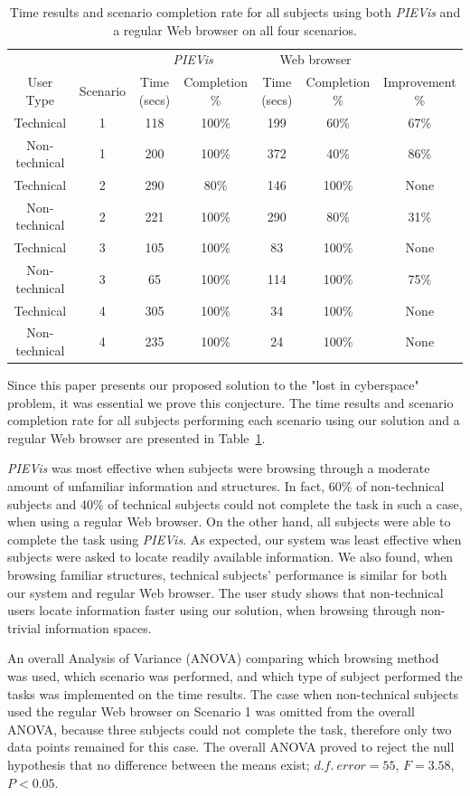 \documentclass[]{article}
\begin{document}
{\begin{table}[t]
\begin{center}
\begin{tabular}{|c|c|c|c|c|c|c|}
& &\multicolumn{2}{|c|}{{\em PIEVis}}&\multicolumn{2}{|c|}{Web browser} & \\\cline{3-6}
User Type&Scenario&Time (secs)&Completion \%&Time (secs)&Completion \%&Improvement \%\\\hline

Technical&1&118&100\%&199&60\%&67\%\\\hline
Non-technical&1&200&100\%&372&40\%&86\%\\\hline
Technical&2&290&80\%&146&100\%&None\\\hline
Non-technical&2&221&100\%&290&80\%&31\%\\\hline
Technical&3&105&100\%&83&100\%&None\\\hline
Non-technical&3&65&100\%&114&100\%&75\%\\\hline
Technical&4&305&100\%&34&100\%&None\\\hline
Non-technical&4&235&100\%&24&100\%&None\\\hline

\end{tabular}
\end{center}
\caption{Time results and scenario completion rate for all subjects using both {\em PIEVis} and a regular Web browser on all four scenarios.}
\label{table:time}
\end{table}

Since this paper presents our proposed solution to the "lost in cyberspace" problem, it was essential we prove this conjecture.
The time results and scenario completion rate for all subjects performing each scenario using our solution and a regular Web browser are presented in Table~\ref{table:time}.

{\em PIEVis} was most effective when subjects were browsing through a moderate amount of unfamiliar information and structures.
In fact, 60\% of non-technical subjects and 40\% of technical subjects could not complete the task in such a case, when using a regular Web browser.
On the other hand, all subjects were able to complete the task using {\em PIEVis}.
As expected, our system was least effective when subjects were asked to locate readily available information.
We also found, when browsing familiar structures, technical subjects' performance is similar for both our system and regular Web browser.
The user study shows that non-technical users locate information faster using our solution, when browsing through non-trivial information spaces.



An overall Analysis of Variance (ANOVA) comparing which browsing method was used, which scenario was performed, and which type of subject performed the tasks was implemented on the time results.
The case when non-technical subjects used the regular Web browser on Scenario 1 was omitted from the overall ANOVA, because three subjects could not complete the task, therefore only two data points remained for this case.
The overall ANOVA proved to reject the null hypothesis that no difference between the means exist; $d.f.\ error=55$, $F=3.58$, $P<0.05$.

}
\end{document}
